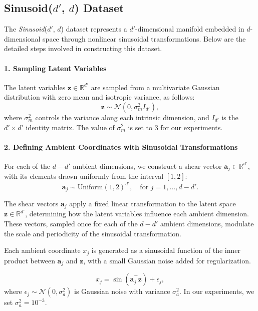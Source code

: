\subsection{\texorpdfstring{Sinusoid($d'$, $d$)}{Sinusoid(d', d)} Dataset}

The \textit{Sinusoid}($d'$, $d$) dataset represents a $d'$-dimensional manifold embedded in $d$-dimensional space through nonlinear sinusoidal transformations. Below are the detailed steps involved in constructing this dataset.

\paragraph{1. Sampling Latent Variables}

The latent variables $\mathbf{z} \in \mathbb{R}^{d'}$ are sampled from a multivariate Gaussian distribution with zero mean and isotropic variance, as follows:
\[
\mathbf{z} \sim \mathcal{N}\left( 0, \sigma_m^2 I_{d'} \right),
\]
where $\sigma_m^2$ controls the variance along each intrinsic dimension, and $I_{d'}$ is the $d' \times d'$ identity matrix. The value of $\sigma_m^2$ is set to 3 for our experiments.

\paragraph{2. Defining Ambient Coordinates with Sinusoidal Transformations}

For each of the $d-d'$ ambient dimensions, we construct a shear vector \( \mathbf{a}_j \in \mathbb{R}^{d'} \), with its elements drawn uniformly from the interval \([1, 2]\):
\[
\mathbf{a}_j \sim \text{Uniform}(1, 2)^{d'}, \quad \text{for } j = 1, \dots, d-d'.
\]

The shear vectors \( \mathbf{a}_j \) apply a fixed linear transformation to the latent space \( \mathbf{z} \in \mathbb{R}^{d'} \), determining how the latent variables influence each ambient dimension. These vectors, sampled once for each of the $d-d'$ ambient dimensions, modulate the scale and periodicity of the sinusoidal transformation.

Each ambient coordinate \( x_j \) is generated as a sinusoidal function of the inner product between \( \mathbf{a}_j \) and \( \mathbf{z} \), with a small Gaussian noise added for regularization.

\[
x_j = \sin\left( \mathbf{a}_j^\top \mathbf{z} \right) + \epsilon_j,
\]
where \( \epsilon_j \sim \mathcal{N}(0, \sigma_a^2) \) is Gaussian noise with variance \( \sigma_a^2 \). In our experiments, we set \( \sigma_a^2 = 10^{-3} \).

